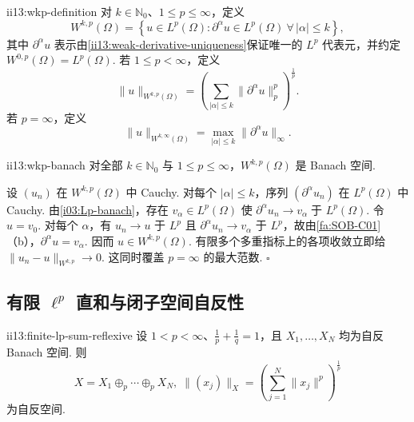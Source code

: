 \begin{FADefinition}[A][高阶 Sobolev 空间]{ii13:wkp-definition}
对 \(\displaystyle k\in\mathbb N_0\)、\(\displaystyle1\leqslant p\leqslant\infty\)，定义
\[
W^{k,p}(\Omega)
=
\left\{u\in L^p(\Omega):
\partial^\alpha u\in L^p(\Omega)\ \forall\,|\alpha|\leqslant k
\right\},
\]
其中 \(\displaystyle\partial^\alpha u\) 表示由\autoref{ii13:weak-derivative-uniqueness}保证唯一的 \(\displaystyle L^p\) 代表元，并约定 \(\displaystyle W^{0,p}(\Omega)=L^p(\Omega).\)
若 \(\displaystyle1\leqslant p<\infty\)，定义
\[
\|u\|_{W^{k,p}(\Omega)}
=
\left(
\sum_{|\alpha|\leqslant k}
\|\partial^\alpha u\|_p^p
\right)^{\frac{1}{p}}.
\]
若 \(\displaystyle p=\infty\)，定义
\[
\|u\|_{W^{k,\infty}(\Omega)}
=
\max_{|\alpha|\leqslant k}
\|\partial^\alpha u\|_\infty.
\]
\end{FADefinition}

\begin{FAProposition}{ii13:wkp-banach}
对全部 \(\displaystyle k\in\mathbb N_0\) 与 \(\displaystyle1\leqslant p\leqslant\infty\)，\(\displaystyle W^{k,p}(\Omega)\) 是 Banach 空间.
\end{FAProposition}

\begin{FAProof}
设 \(\displaystyle(u_n)\) 在 \(\displaystyle W^{k,p}(\Omega)\) 中 Cauchy. 对每个 \(\displaystyle|\alpha|\leqslant k\)，序列 \(\displaystyle(\partial^\alpha u_n)\) 在 \(\displaystyle L^p(\Omega)\) 中 Cauchy. 由\autoref{i03:Lp-banach}，存在 \(\displaystyle v_\alpha\in L^p(\Omega)\) 使 \(\displaystyle \partial^\alpha u_n \longrightarrow v_\alpha \;\text{于 }L^p(\Omega).\)
令 \(\displaystyle u=v_0\). 对每个 \(\displaystyle\alpha\)，有 \(\displaystyle u_n\to u\) 于 \(\displaystyle L^p\) 且 \(\displaystyle\partial^\alpha u_n\to v_\alpha\) 于 \(\displaystyle L^p\)，故由\autoref{fa:SOB-C01}（b），\(\displaystyle\partial^\alpha u=v_\alpha\). 因而 \(\displaystyle u\in W^{k,p}(\Omega)\). 有限多个多重指标上的各项收敛立即给 \(\displaystyle\|u_n-u\|_{W^{k,p}}\to0\). 这同时覆盖 \(\displaystyle p=\infty\) 的最大范数.
\hfill\(\square\)
\end{FAProof}

\subsection{有限 \texorpdfstring{\(\displaystyle\ell^p\)}{lp} 直和与闭子空间自反性}

\begin{FALemma}{ii13:finite-lp-sum-reflexive}
设 \(\displaystyle1<p<\infty\)、\(\displaystyle\frac{1}{p}+\frac{1}{q}=1\)，且 \(\displaystyle X_1,\dots,X_N\) 均为自反 Banach 空间. 则
\[
X=X_1\oplus_p\cdots\oplus_pX_N,
\;
\|(x_j)\|_X
=
\left(\sum_{j=1}^N\|x_j\|^p\right)^{\frac{1}{p}}
\]
为自反空间.
\end{FALemma}

